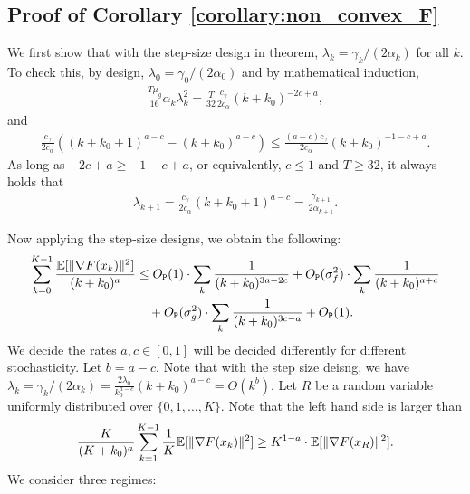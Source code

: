
























\subsection{Proof of Corollary \ref{corollary:non_convex_F}}

We first show that with the step-size design in theorem, $\lambda_k = \gamma_k / (2\alpha_k)$ for all $k$. To check this, by design, $\lambda_0 = \gamma_0 / (2\alpha_0)$ and by mathematical induction, 
\begin{align*}
    \frac{T \mu_g}{16} \alpha_k \lambda_k^2 = \frac{T}{32} \frac{c_\gamma}{2 c_\alpha} (k+k_0)^{-2c + a},
\end{align*}
and 
\begin{align*}
    \frac{c_\gamma}{2 c_\alpha} ((k + k_0 + 1)^{a-c} - (k+k_0)^{a-c}) \le \frac{(a-c) c_\gamma}{2 c_\alpha} (k+k_0)^{-1-c+a}.
\end{align*}
As long as $-2c + a \ge -1 - c + a$, or equivalently, $c \le 1$ and $T \ge 32$, it always holds that
\begin{align}
    \lambda_{k+1} = \frac{c_\gamma}{2c_\alpha} (k+k_0 + 1)^{a-c} = \frac{\gamma_{k+1}}{2\alpha_{k+1}}. \label{eq:lambda_math_induction}
\end{align}

Now applying the step-size designs, we obtain the following:
\begin{align}
    \sum_{k=0}^{K-1} \frac{\mathbb{E}[\|\nabla F(x_k)\|^2]}{(k+k_0)^{a}} &\le O_{\texttt{P}} (1) \cdot \sum_{k} \frac{1}{(k+k_0)^{3a-2c}} + O_{\texttt{P}}(\sigma_f^2) \cdot \sum_{k} \frac{1}{(k+k_0)^{a+c}} \nonumber \\
    &\quad + O_{\texttt{P}}(\sigma_g^2) \cdot \sum_{k} \frac{1}{(k+k_0)^{3c-a}} + O_{\texttt{P}}(1). 
\end{align}
We decide the rates $a,c \in [0,1]$ will be decided differently for different stochasticity. Let $b = a - c$. Note that with the step size deisng, we have $\lambda_k = \gamma_{k} / (2\alpha_k) = \frac{2\lambda_0}{k_0^{a-c}} (k+k_0)^{a-c} = O(k^{b})$. Let $R$ be a random variable uniformly distributed over $\{0,1, ..., K\}$. Note that the left hand side is larger than
\begin{align*}
    \frac{K}{(K+k_0)^a} \sum_{k=1}^{K-1} \frac{1}{K} \mathbb{E}[\|\nabla F(x_k)\|^2] \ge K^{1-a} \cdot \mathbb{E}[\|\nabla F(x_R)\|^2]. 
\end{align*}
We consider three regimes:

